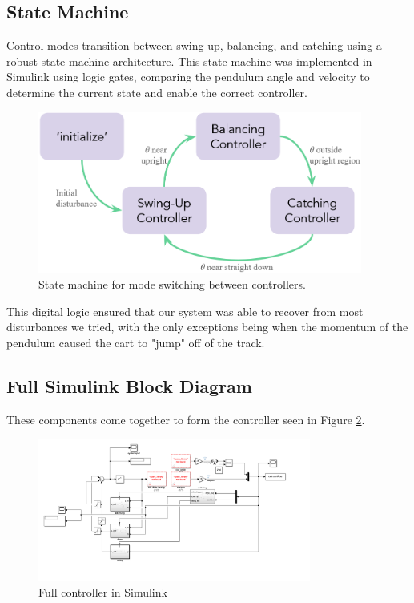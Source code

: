 \documentclass[12pt]{article}
\begin{document}
\subsection{State Machine}
Control modes transition between swing-up, balancing, and catching using a robust state machine architecture.
This state machine was implemented in Simulink using logic gates, comparing the pendulum angle and velocity to determine the current state and enable the correct controller.

\begin{figure}[H]
    \centering
    \includegraphics[width=0.95\textwidth]{figures/state_machine.png}
    \caption{State machine for mode switching between controllers.}
    \label{fig:state_machine}
\end{figure}

This digital logic ensured that our system was able to recover from most disturbances we tried, with the only exceptions being when the momentum of the pendulum caused the cart to "jump" off of the track.

\subsection{Full Simulink Block Diagram}
These components come together to form the controller seen in Figure \ref{fig:full_c}.

\begin{figure}[H]
    \centering
    \includegraphics[width=0.8\textwidth]{figures/full-controller.png}
    \caption{Full controller in Simulink}
    \label{fig:full_c}
\end{figure}
\end{document}
